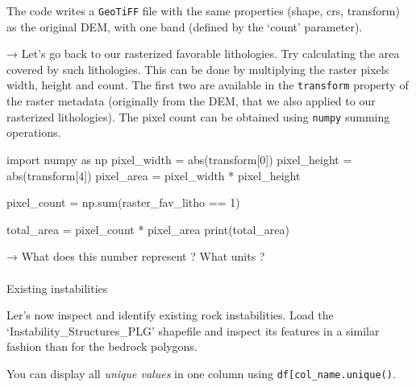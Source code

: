 \documentclass[
  letterpaper,
  DIV=11,
  numbers=noendperiod]{scrartcl}
\makeatletter
\let\oldparagraph\paragraph
\renewcommand{\paragraph}{
    \@ifstar
      \xxxParagraphStar
      \xxxParagraphNoStar
  }
\newcommand{\xxxParagraphStar}[1]{\oldparagraph*{#1}\mbox{}}
\newcommand{\xxxParagraphNoStar}[1]{\oldparagraph{#1}\mbox{}}
\newenvironment{Shaded}{\begin{snugshade}}{\end{snugshade}}
\newcommand{\BuiltInTok}[1]{\textcolor[rgb]{0.00,0.23,0.31}{#1}}
\newcommand{\DecValTok}[1]{\textcolor[rgb]{0.68,0.00,0.00}{#1}}
\newcommand{\ImportTok}[1]{\textcolor[rgb]{0.00,0.46,0.62}{#1}}
\newcommand{\NormalTok}[1]{\textcolor[rgb]{0.00,0.23,0.31}{#1}}
\newcommand{\OperatorTok}[1]{\textcolor[rgb]{0.37,0.37,0.37}{#1}}
\makeatother
\begin{document}
The code writes a \texttt{GeoTiFF} file with the same properties (shape,
crs, transform) as the original DEM, with one band (defined by the
`count' parameter).

→ Let's go back to our rasterized favorable lithologies. Try calculating
the area covered by such lithologies. This can be done by multiplying
the raster pixels width, height and count. The first two are available
in the \texttt{transform} property of the raster metadata (originally
from the DEM, that we also applied to our rasterized lithologies). The
pixel count can be obtained using \texttt{numpy} summing operations.

\begin{Shaded}
\begin{Highlighting}[]
\ImportTok{import}\NormalTok{ numpy }\ImportTok{as}\NormalTok{ np}
\NormalTok{pixel\_width }\OperatorTok{=} \BuiltInTok{abs}\NormalTok{(transform[}\DecValTok{0}\NormalTok{])}
\NormalTok{pixel\_height }\OperatorTok{=} \BuiltInTok{abs}\NormalTok{(transform[}\DecValTok{4}\NormalTok{])}
\NormalTok{pixel\_area }\OperatorTok{=}\NormalTok{ pixel\_width }\OperatorTok{*}\NormalTok{ pixel\_height}

\NormalTok{pixel\_count }\OperatorTok{=}\NormalTok{ np.}\BuiltInTok{sum}\NormalTok{(raster\_fav\_litho }\OperatorTok{==} \DecValTok{1}\NormalTok{)}

\NormalTok{total\_area }\OperatorTok{=}\NormalTok{ pixel\_count }\OperatorTok{*}\NormalTok{ pixel\_area}
\BuiltInTok{print}\NormalTok{(total\_area)}
\end{Highlighting}
\end{Shaded}

→ What does this number represent ? What units ?

\paragraph{Existing instabilities}\label{existing-instabilities}

Ler's now inspect and identify existing rock instabilities. Load the
`Instability\_Structures\_PLG' shapefile and inspect its features in a
similar fashion than for the bedrock polygons.

\begin{tcolorbox}[enhanced jigsaw, arc=.35mm, left=2mm, toprule=.15mm, colbacktitle=quarto-callout-tip-color!10!white, toptitle=1mm, breakable, opacityback=0, rightrule=.15mm, title=\textcolor{quarto-callout-tip-color}{\faLightbulb}\hspace{0.5em}{Unique values}, colframe=quarto-callout-tip-color-frame, bottomrule=.15mm, colback=white, opacitybacktitle=0.6, bottomtitle=1mm, titlerule=0mm, coltitle=black, leftrule=.75mm]

You can display all \emph{unique values} in one column using
\texttt{df{[}\textquotesingle{}col\_name\textquotesingle{}{]}.unique()}.

\end{tcolorbox}
\end{document}
